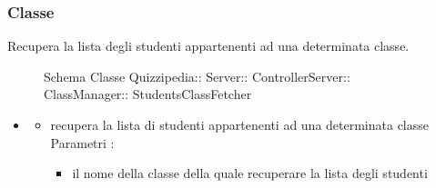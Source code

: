 \subsubsection{Classe }
Recupera la lista degli studenti appartenenti ad una determinata classe.
\begin{figure}[H]
\centering
\noindent{}
\caption[Schema Classe StudentsClassFetcher]{Schema Classe Quizzipedia:: Server:: ControllerServer:: ClassManager:: StudentsClassFetcher}
\end{figure}
\begin{itemize}
\item {}
\begin{itemize}
\item {}
\newline
recupera la lista di studenti appartenenti ad una determinata classe
\newline
Parametri :
\begin{itemize}
\item {}
\newline
il nome della classe della quale recuperare la lista degli studenti
\end{itemize}
\end{itemize}
\end{itemize}
